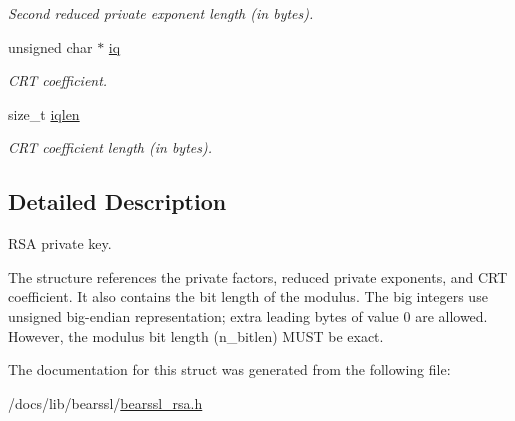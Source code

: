 \begin{DoxyCompactItemize}
\begin{DoxyCompactList}\small\item\em Second reduced private exponent length (in bytes). \end{DoxyCompactList}\item 
\mbox{\label{structbr__rsa__private__key_aef2776053e415528d6c61ef6bfe69580}} 
unsigned char $\ast$ \hyperlink{structbr__rsa__private__key_aef2776053e415528d6c61ef6bfe69580}{iq}
\begin{DoxyCompactList}\small\item\em C\+RT coefficient. \end{DoxyCompactList}\item 
\mbox{\label{structbr__rsa__private__key_aa3bcdfee6999d70f8ea1bafd2b9cec63}} 
size\+\_\+t \hyperlink{structbr__rsa__private__key_aa3bcdfee6999d70f8ea1bafd2b9cec63}{iqlen}
\begin{DoxyCompactList}\small\item\em C\+RT coefficient length (in bytes). \end{DoxyCompactList}\end{DoxyCompactItemize}


\subsection{Detailed Description}
R\+SA private key. 

The structure references the private factors, reduced private exponents, and C\+RT coefficient. It also contains the bit length of the modulus. The big integers use unsigned big-\/endian representation; extra leading bytes of value 0 are allowed. However, the modulus bit length ({\ttfamily n\+\_\+bitlen}) M\+U\+ST be exact. 

The documentation for this struct was generated from the following file\+:\begin{DoxyCompactItemize}
\item 
/docs/lib/bearssl/\hyperlink{bearssl__rsa_8h}{bearssl\+\_\+rsa.\+h}\end{DoxyCompactItemize}
